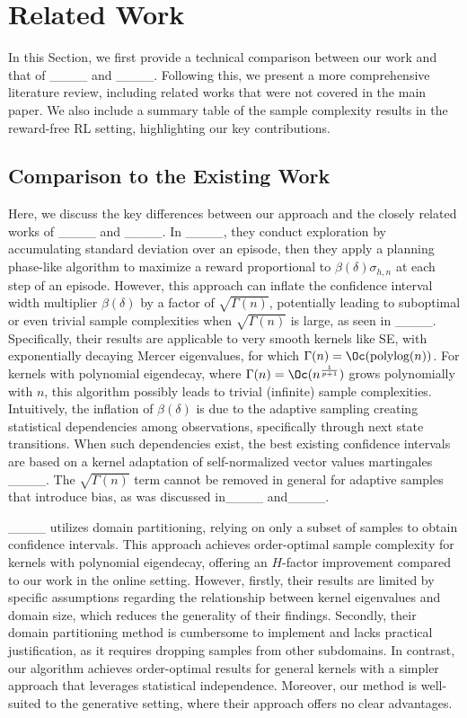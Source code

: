 \section{Related Work}
\label{sec:relatedworks}
In this Section, we first provide a technical comparison between our work and that of ____ and ____. Following this, we present a more comprehensive literature review, including related works that were not covered in the main paper. We also include a summary table of the sample complexity results in the reward-free RL setting, highlighting our key contributions.

\subsection{Comparison to the Existing Work} \label{appx:comp}

Here, we discuss the key differences between our approach and the closely related works of ____ and ____. In ____, they conduct exploration by accumulating standard deviation over an episode, then they apply a planning phase-like algorithm to maximize a reward proportional to $\beta(\delta)\sigma_{h,n}$ at each step of an episode. However, this approach can inflate the confidence interval width multiplier $\beta(\delta)$ by a factor of $\sqrt{\Gamma(n)}$, potentially leading to suboptimal or even trivial sample complexities when $\sqrt{\Gamma(n)}$ is large, as seen in ____. Specifically, their results are applicable to very smooth kernels like SE, with exponentially decaying Mercer eigenvalues, for which $\Gamma(n)=\Oc(\text{polylog}(n))$. For kernels with polynomial eigendecay, where $\Gamma(n)=\Oc(n^{\frac{1}{p+1}})$ grows polynomially with $n$, this algorithm possibly leads to trivial (infinite) sample complexities. Intuitively, the inflation of $\beta(\delta)$ is due to the  adaptive sampling creating statistical dependencies among observations, specifically through next state transitions. When such dependencies exist, the best existing confidence intervals are based on a kernel adaptation of self-normalized vector values martingales ____. The $\sqrt{\Gamma(n)}$ term cannot be removed in general for adaptive samples that introduce bias, as was discussed in____ and____.  

____ utilizes domain partitioning, relying on only a subset of samples to obtain confidence intervals. This approach achieves order-optimal sample complexity for kernels with polynomial eigendecay, offering an $H$-factor improvement compared to our work in the online setting. However, firstly, their results are limited by specific assumptions regarding the relationship between kernel eigenvalues and domain size, which reduces the generality of their findings. Secondly, their domain partitioning method is cumbersome to implement and lacks practical justification, as it requires dropping samples from other subdomains. In contrast, our algorithm achieves order-optimal results for general kernels with a simpler approach that leverages statistical independence. Moreover, our method is well-suited to the generative setting, where their approach offers no clear advantages.

